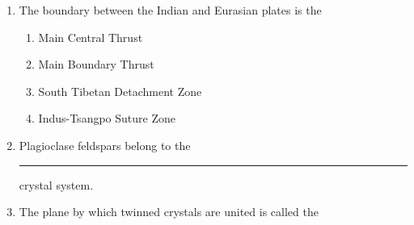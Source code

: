 \documentclass[journal,12pt,onecolumn]{IEEEtran}
\theoremstyle{remark}
\begin{document}
\begin{enumerate}
\begin {enumerate}
            \end{enumerate}
    \item The boundary between the Indian and Eurasian plates is the \hfill{} 
        \begin{enumerate}
                \item Main Central Thrust
                \item Main Boundary Thrust
                \item South Tibetan Detachment Zone
                \item Indus-Tsangpo Suture Zone                
            \end{enumerate}
    \item Plagioclase feldspars belong to the \rule{2.5cm}{0.15mm} crystal system. \hfill{} 
        \begin {enumerate}
            \end{enumerate}
    \item The plane by which twinned crystals are united is called the \hfill{} 
        \begin {enumerate}
            \end{enumerate}

\end{enumerate}
\end{document}
